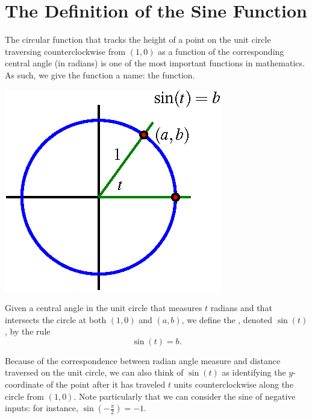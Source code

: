 \documentclass[nooutcomes]{ximera}
\begin{document}

\section{The Definition of the Sine Function}

The circular function that tracks the height of a point on the unit circle traversing counterclockwise from \((1,0)\) as a function of the corresponding central angle (in radians) is one of the most important functions in mathematics.  As such, we give the function a name:  the  function.%

\begin{definition}
\begin{image}
\includegraphics{sine-defn.png}
\end{image}
Given a central angle in the unit circle that measures \(t\) radians and that intersects the circle at both \((1,0)\) and \((a,b)\), we define the , denoted \(\sin(t)\), by the rule
\begin{equation*}
\sin(t) = b\text{.}
\end{equation*}
\end{definition}

Because of the correspondence between radian angle measure and distance traversed on the unit circle, we can also think of \(\sin(t)\) as identifying the \(y\)-coordinate of the point after it has traveled \(t\) units counterclockwise along the circle from \((1,0)\).  Note particularly that we can consider the sine of negative inputs:  for instance, \(\sin\left(-\frac{\pi}{2}\right) = -1\).
\end{document}
